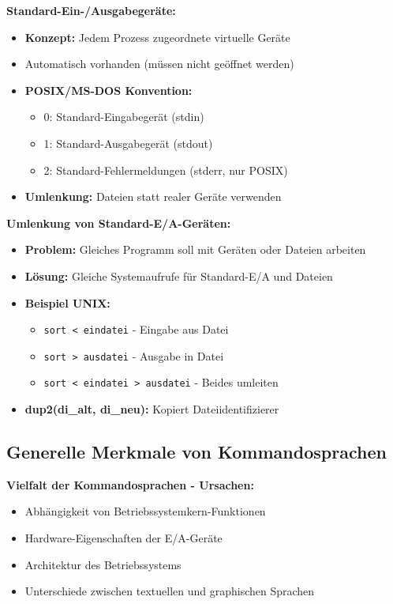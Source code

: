 \documentclass[9pt,a4paper]{extarticle}
\begin{document}
\begin{multicols*}{2}
\textbf{Standard-Ein-/Ausgabegeräte:}
\begin{itemize}
\item \textbf{Konzept:} Jedem Prozess zugeordnete virtuelle Geräte
\item Automatisch vorhanden (müssen nicht geöffnet werden)
\item \textbf{POSIX/MS-DOS Konvention:}
  \begin{itemize}
  \item 0: Standard-Eingabegerät (stdin)
  \item 1: Standard-Ausgabegerät (stdout)
  \item 2: Standard-Fehlermeldungen (stderr, nur POSIX)
  \end{itemize}
\item \textbf{Umlenkung:} Dateien statt realer Geräte verwenden
\end{itemize}

\textbf{Umlenkung von Standard-E/A-Geräten:}
\begin{itemize}
\item \textbf{Problem:} Gleiches Programm soll mit Geräten oder Dateien arbeiten
\item \textbf{Lösung:} Gleiche Systemaufrufe für Standard-E/A und Dateien
\item \textbf{Beispiel UNIX:}
  \begin{itemize}
  \item \texttt{sort < eindatei} - Eingabe aus Datei
  \item \texttt{sort > ausdatei} - Ausgabe in Datei
  \item \texttt{sort < eindatei > ausdatei} - Beides umleiten
  \end{itemize}
\item \textbf{dup2(di\_alt, di\_neu):} Kopiert Dateiidentifizierer
\end{itemize}

\subsection{Generelle Merkmale von Kommandosprachen}
\textbf{Vielfalt der Kommandosprachen - Ursachen:}
\begin{itemize}
\item Abhängigkeit von Betriebssystemkern-Funktionen
\item Hardware-Eigenschaften der E/A-Geräte
\item Architektur des Betriebssystems
\item Unterschiede zwischen textuellen und graphischen Sprachen
\end{itemize}


\end{multicols*}
\end{document}
